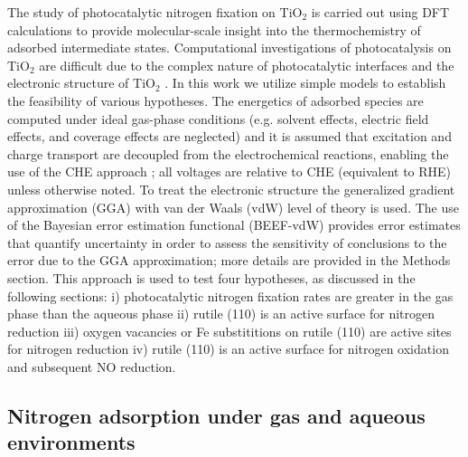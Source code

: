 \documentclass[journal=ascecg,manuscript=article,articletitle=true]{achemso}
\begin{document}
The study of photocatalytic nitrogen fixation on TiO$_2$ is carried out using DFT calculations to provide molecular-scale insight into the thermochemistry of adsorbed intermediate states. Computational investigations of photocatalysis on TiO$_2$ are difficult due to the complex nature of photocatalytic interfaces \cite{Calle_Vallejo_2012,Hellman2017} and the electronic structure of TiO$_2$ \cite{Arroyo_de_Dompablo_2011,Diebold2003}. In this work we utilize simple models to establish the feasibility of various hypotheses. The energetics of adsorbed species are computed under ideal gas-phase conditions (e.g. solvent effects, electric field effects, and coverage effects are neglected) and it is assumed that excitation and charge transport are decoupled from the electrochemical reactions, enabling the use of the CHE approach \cite{Norskov_2004,Peterson_2010,Hellman2017,Calle_Vallejo_2012}; all voltages are relative to CHE (equivalent to RHE) unless otherwise noted. To treat the electronic structure the generalized gradient approximation (GGA) with van der Waals (vdW) level of theory is used. The use of the Bayesian error estimation functional \cite{Wellendorff_2012} (BEEF-vdW) provides error estimates that quantify uncertainty in order to assess the sensitivity of conclusions to the error due to the GGA approximation; more details are provided in the Methods section. This approach is used to test four hypotheses, as discussed in the following sections: i) photocatalytic nitrogen fixation rates are greater in the gas phase than the aqueous phase ii) rutile (110) is an active surface for nitrogen reduction iii) oxygen vacancies or Fe substititions on rutile (110) are active sites for nitrogen reduction iv) rutile (110) is an active surface for nitrogen oxidation and subsequent NO reduction.

\subsection{Nitrogen adsorption under gas and aqueous environments}
\end{document}

